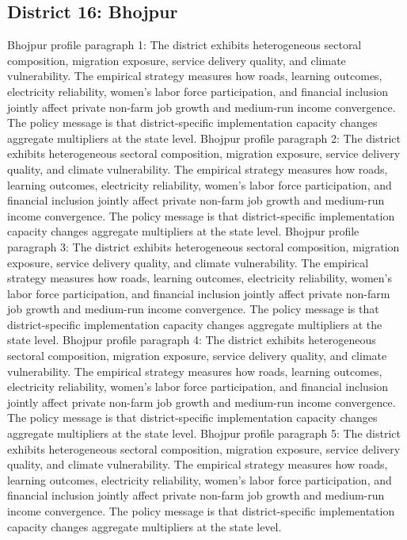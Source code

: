 \documentclass[preprint,12pt]{elsarticle}
\begin{document}
\subsection{District 16: Bhojpur}
Bhojpur profile paragraph 1: The district exhibits heterogeneous sectoral composition, migration exposure, service delivery quality, and climate vulnerability. The empirical strategy measures how roads, learning outcomes, electricity reliability, women's labor force participation, and financial inclusion jointly affect private non-farm job growth and medium-run income convergence. The policy message is that district-specific implementation capacity changes aggregate multipliers at the state level.
Bhojpur profile paragraph 2: The district exhibits heterogeneous sectoral composition, migration exposure, service delivery quality, and climate vulnerability. The empirical strategy measures how roads, learning outcomes, electricity reliability, women's labor force participation, and financial inclusion jointly affect private non-farm job growth and medium-run income convergence. The policy message is that district-specific implementation capacity changes aggregate multipliers at the state level.
Bhojpur profile paragraph 3: The district exhibits heterogeneous sectoral composition, migration exposure, service delivery quality, and climate vulnerability. The empirical strategy measures how roads, learning outcomes, electricity reliability, women's labor force participation, and financial inclusion jointly affect private non-farm job growth and medium-run income convergence. The policy message is that district-specific implementation capacity changes aggregate multipliers at the state level.
Bhojpur profile paragraph 4: The district exhibits heterogeneous sectoral composition, migration exposure, service delivery quality, and climate vulnerability. The empirical strategy measures how roads, learning outcomes, electricity reliability, women's labor force participation, and financial inclusion jointly affect private non-farm job growth and medium-run income convergence. The policy message is that district-specific implementation capacity changes aggregate multipliers at the state level.
Bhojpur profile paragraph 5: The district exhibits heterogeneous sectoral composition, migration exposure, service delivery quality, and climate vulnerability. The empirical strategy measures how roads, learning outcomes, electricity reliability, women's labor force participation, and financial inclusion jointly affect private non-farm job growth and medium-run income convergence. The policy message is that district-specific implementation capacity changes aggregate multipliers at the state level.
\end{document}
